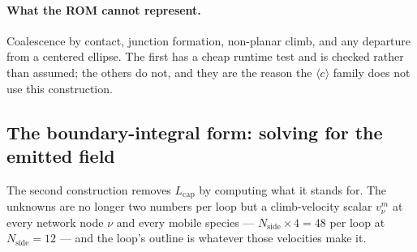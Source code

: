 \documentclass{article}
\newcommand{\cloop}{\ensuremath{\langle c\rangle}}
\begin{document}
\paragraph{What the ROM cannot represent.} Coalescence by contact, junction
formation, non-planar climb, and any departure from a centered ellipse. The first
has a cheap runtime test and is checked rather than assumed; the others do not,
and they are the reason the \cloop{} family does not use this construction.

\subsection{The boundary-integral form: solving for the emitted field}
\label{sec:bim-climb}

The second construction removes $L_{\mathrm{cap}}$ by computing what it stands
for. The unknowns are no longer two numbers per loop but a climb-velocity scalar
$v^m_\nu$ at every network node $\nu$ and every mobile species ---
$N_{\mathrm{side}}\times4=48$ per loop at $N_{\mathrm{side}}=12$ --- and the
loop's outline is whatever those velocities make it.
\end{document}
